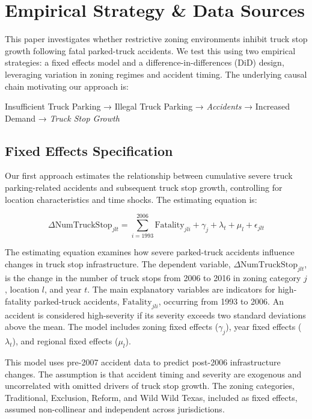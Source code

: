 \documentclass[
  12pt]{article}
\begin{document}
\section{Empirical Strategy \& Data
Sources}\label{empirical-strategy-data-sources}

This paper investigates whether restrictive zoning environments inhibit
truck stop growth following fatal parked-truck accidents. We test this
using two empirical strategies: a fixed effects model and a
difference-in-differences (DiD) design, leveraging variation in zoning
regimes and accident timing. The underlying causal chain motivating our
approach is:

Insufficient Truck Parking → Illegal Truck Parking → \emph{Accidents} →
Increased Demand → \emph{Truck Stop Growth}

\subsection{Fixed Effects
Specification}\label{fixed-effects-specification}

Our first approach estimates the relationship between cumulative severe
truck parking-related accidents and subsequent truck stop growth,
controlling for location characteristics and time shocks. The estimating
equation is:

\[
\Delta \text{NumTruckStop}_{jlt} = \sum_{i=1993}^{2006} \text{Fatality}_{jli} + \gamma_j + \lambda_t + \mu_l + \epsilon_{jlt}
\]

The estimating equation examines how severe parked-truck accidents
influence changes in truck stop infrastructure. The dependent variable,
\(\Delta \text{NumTruckStop}_{jlt}\), is the change in the number of
truck stops from 2006 to 2016 in zoning category \(j\), location \(l\),
and year \(t\). The main explanatory variables are indicators for
high-fatality parked-truck accidents, \(\text{Fatality}_{jli}\),
occurring from 1993 to 2006. An accident is considered high-severity if
its severity exceeds two standard deviations above the mean. The model
includes zoning fixed effects (\(\gamma_j\)), year fixed effects
(\(\lambda_t\)), and regional fixed effects (\(\mu_l\)).

This model uses pre-2007 accident data to predict post-2006
infrastructure changes. The assumption is that accident timing and
severity are exogenous and uncorrelated with omitted drivers of truck
stop growth. The zoning categories, Traditional, Exclusion, Reform, and
Wild Wild Texas, included as fixed effects, assumed non-collinear and
independent across jurisdictions.
\end{document}
